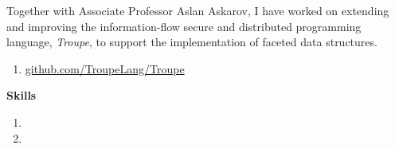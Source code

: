 
Together with Associate Professor Aslan Askarov, I have worked on extending and improving the
information-flow secure and distributed programming language, \emph{Troupe}, to support the
implementation of faceted data structures.

\medskip

\begin{enumerate}[leftmargin=2.5em]
\item[\indent\faGit] \href{https://github.com/TroupeLang/Troupe}{github.com/TroupeLang/Troupe}
\end{enumerate}

\medskip
{\color{accent} \textbf{Skills}}
\smallskip

\begin{enumerate}[leftmargin=2.5em] \small
\item[\indent\faWrench]    
\item[\indent\faLightbulbO]  
\end{enumerate}
